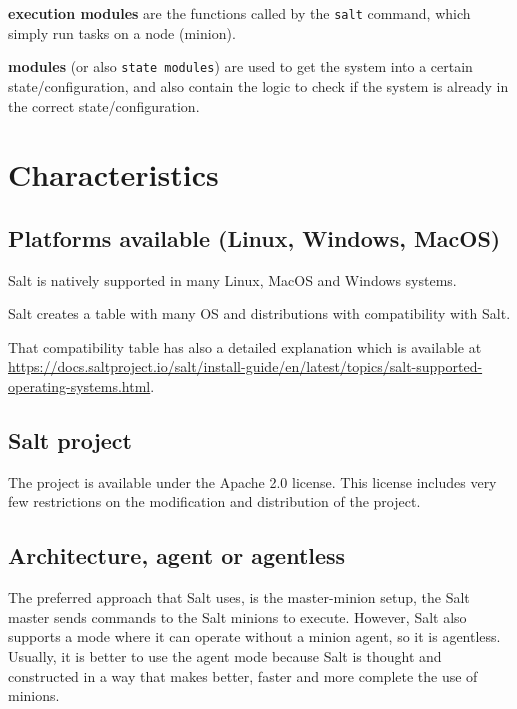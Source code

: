 \documentclass[12pt,a4paper,openright,twoside]{book}
\begin{document}
\textbf{execution modules} are the functions called by the \texttt{salt} command, which simply run tasks on a node (minion).


\textbf{modules} (or also \texttt{state modules}) are used to get the system into a certain state/configuration, and also contain the logic to check if the system is already in the correct state/configuration.


\section{Characteristics}

\subsection{Platforms available (Linux, Windows, MacOS)}
Salt is natively supported in many Linux, MacOS and Windows systems.


Salt creates a table with many OS and distributions with compatibility with Salt.

That compatibility table has also a detailed explanation which is available at \url{https://docs.saltproject.io/salt/install-guide/en/latest/topics/salt-supported-operating-systems.html}.

\subsection{Salt project}
The project is available under the Apache 2.0 license. This license includes very few restrictions on the modification and distribution of the project.

\subsection{Architecture, agent or agentless}
The preferred approach that Salt uses, is the master-minion setup, the Salt master sends commands to the Salt minions to execute.
However, Salt also supports a mode where it can operate without a minion agent, so it is agentless.
Usually, it is better to use the agent mode because Salt is thought and constructed in a way that makes better, faster and more complete the use of minions.

\end{document}
